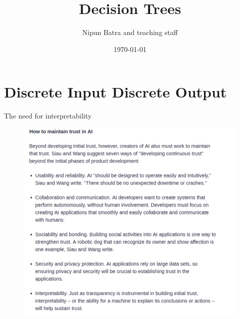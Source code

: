 \documentclass[usenames,dvipsnames]{beamer}
\title{Decision Trees}
\date{\today}
\author{Nipun Batra and teaching staff}
\institute{IIT Gandhinagar}
\begin{document}
	\maketitle
	
	
	\section{Discrete Input Discrete Output}
	\begin{frame}{The need for interpretability}
	\begin{figure}
		\centering
		\includegraphics[scale=0.32]{../assets/decision-trees/diagrams/interpretability}
		\label{fig:interpretability}
	\end{figure}
	
\end{frame}
	
\end{document}
